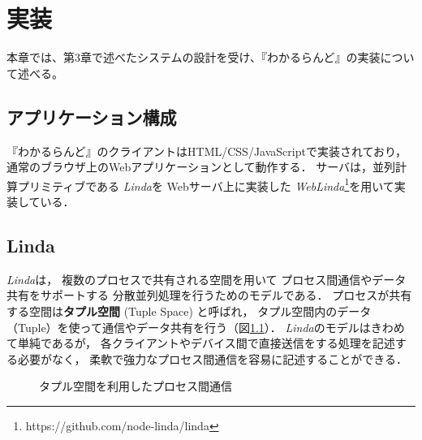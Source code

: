 \chapter{実装}
\label{chap:implementation}

本章では、第3章で述べたシステムの設計を受け、『わかるらんど』の実装について述べる。

\newpage

\section{アプリケーション構成}

『わかるらんど』のクライアントはHTML/CSS/JavaScriptで実装されており，
通常のブラウザ上のWebアプリケーションとして動作する．
サーバは，並列計算プリミティブである
\textit{Linda}\cite{Carriero:1989:LC:63334.63337}を
Webサーバ上に実装した
\textit{WebLinda}\cite{shokai_furnitue}\footnote{https://github.com/node-linda/linda}を用いて実装している．

\section{Linda}

\textit{Linda}は，
複数のプロセスで共有される空間を用いて
プロセス間通信やデータ共有をサポートする
分散並列処理を行うためのモデルである\cite{masui_linda}．
プロセスが共有する空間は\textbf{タプル空間} (Tuple Space) と呼ばれ，
タプル空間内のデータ （Tuple）を使って通信やデータ共有を行う（図\ref{linda}）．
\textit{Linda}のモデルはきわめて単純であるが，
各クライアントやデバイス間で直接送信をする処理を記述する必要がなく，
柔軟で強力なプロセス間通信を容易に記述することができる．

\begin{figure}[H]
\centering
{}
\caption{タプル空間を利用したプロセス間通信}
\label{linda}
\end{figure}

